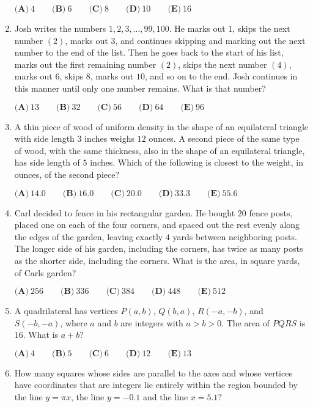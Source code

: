 \documentclass{article}
\begin{document}
\begin{enumerate}[label=\arabic*., itemsep=0.5em]
$\textbf{(A)}\ 4\qquad\textbf{(B)}\ 6\qquad\textbf{(C)}\ 8\qquad\textbf{(D)}\ 10\qquad\textbf{(E)}\ 16$\par \vspace{0.5em}\item Josh writes the numbers $1,2,3,\dots,99,100$. He marks out $1$, skips the next number $(2)$, marks out $3$, and continues skipping and marking out the next number to the end of the list. Then he goes back to the start of his list, marks out the first remaining number $(2)$, skips the next number $(4)$, marks out $6$, skips $8$, marks out $10$, and so on to the end. Josh continues in this manner until only one number remains. What is that number?

$\textbf{(A)}\ 13 \qquad
\textbf{(B)}\ 32 \qquad
\textbf{(C)}\ 56 \qquad
\textbf{(D)}\ 64 \qquad
\textbf{(E)}\ 96$\par \vspace{0.5em}\item A thin piece of wood of uniform density in the shape of an equilateral triangle with side length $3$ inches weighs $12$ ounces. A second piece of the same type of wood, with the same thickness, also in the shape of an equilateral triangle, has side length of $5$ inches. Which of the following is closest to the weight, in ounces, of the second piece?

$\textbf{(A)}\ 14.0\qquad\textbf{(B)}\ 16.0\qquad\textbf{(C)}\ 20.0\qquad\textbf{(D)}\ 33.3\qquad\textbf{(E)}\ 55.6$\par \vspace{0.5em}\item Carl decided to fence in his rectangular garden. He bought $20$ fence posts, placed one on each of the four corners, and spaced out the rest evenly along the edges of the garden, leaving exactly $4$ yards between neighboring posts. The longer side of his garden, including the corners, has twice as many posts as the shorter side, including the corners. What is the area, in square yards, of Carls garden?

$\textbf{(A)}\ 256\qquad\textbf{(B)}\ 336\qquad\textbf{(C)}\ 384\qquad\textbf{(D)}\ 448\qquad\textbf{(E)}\ 512$\par \vspace{0.5em}\item A quadrilateral has vertices $P(a,b)$, $Q(b,a)$, $R(-a, -b)$, and $S(-b, -a)$, where $a$ and $b$ are integers with $a>b>0$. The area of $PQRS$ is $16$. What is $a+b$?

$\textbf{(A)}\ 4 \qquad\textbf{(B)}\ 5 \qquad\textbf{(C)}\ 6 \qquad\textbf{(D)}\ 12  \qquad\textbf{(E)}\ 13$\par \vspace{0.5em}\item How many squares whose sides are parallel to the axes and whose vertices have coordinates that are integers lie entirely within the region bounded by the line $y=\pi x$, the line $y=-0.1$ and the line $x=5.1?$


\end{enumerate}
\end{document}
